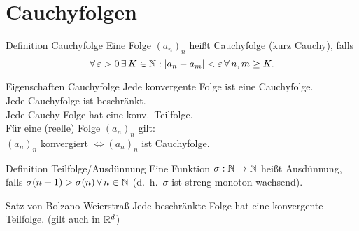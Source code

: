 \documentclass[main.tex]{subfiles}
\begin{document}
\section*{Cauchyfolgen}

\begin{karte}{Definition Cauchyfolge}
    Eine Folge \({(a_n)}_n\) heißt Cauchyfolge (kurz Cauchy), falls
    \[ \forall \varepsilon > 0 \,\exists K\in\N: 
    \abs{a_n-a_m} < \varepsilon \, \forall n,m\geq K. \]
\end{karte}
\begin{karte}{Eigenschaften Cauchyfolge}
    Jede konvergente Folge ist eine Cauchyfolge.\\
    Jede Cauchyfolge ist beschränkt.\\
    Jede Cauchy-Folge hat eine konv.\ Teilfolge.\\
    Für eine (reelle) Folge \({(a_n)}_n\) gilt:\\
    \({(a_n)}_n\) konvergiert 
    \( \Leftrightarrow {(a_n)}_n \) ist Cauchyfolge.
\end{karte}
\begin{karte}{Definition Teilfolge/Ausdünnung}
    Eine Funktion \( \sigma:\mathbb{N} \rightarrow\mathbb{N} \) 
    heißt Ausdünnung, falls \( \sigma (n+1) 
    > \sigma(n) \, \forall n\in\N \) 
    (d.\ h.\  \(\sigma \) ist streng monoton wachsend).
\end{karte}
\begin{karte}{Satz von Bolzano-Weierstraß}
    Jede beschränkte Folge hat eine konvergente Teilfolge. 
    (gilt auch in \( \mathbb{R}^d \))
\end{karte}
\end{document}
